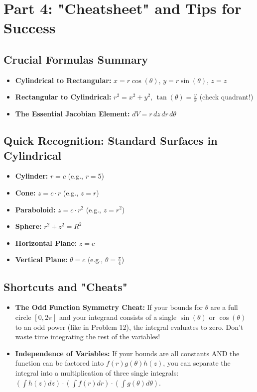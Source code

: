\documentclass[11pt]{article}
\begin{document}
\newpage
\section{Part 4: "Cheatsheet" and Tips for Success}

\subsection{Crucial Formulas Summary}
\begin{itemize}
    \item \textbf{Cylindrical to Rectangular:} $x = r \cos(\theta)$, $y = r \sin(\theta)$, $z = z$
    \item \textbf{Rectangular to Cylindrical:} $r^2 = x^2 + y^2$, $\tan(\theta) = \frac{y}{x}$ (check quadrant!)
    \item \textbf{The Essential Jacobian Element:} $dV = r \, dz \, dr \, d\theta$
\end{itemize}

\subsection{Quick Recognition: Standard Surfaces in Cylindrical}
\begin{itemize}
    \item \textbf{Cylinder:} $r = c$ (e.g., $r = 5$)
    \item \textbf{Cone:} $z = c \cdot r$ (e.g., $z = r$)
    \item \textbf{Paraboloid:} $z = c \cdot r^2$ (e.g., $z = r^2$)
    \item \textbf{Sphere:} $r^2 + z^2 = R^2$
    \item \textbf{Horizontal Plane:} $z = c$
    \item \textbf{Vertical Plane:} $\theta = c$ (e.g., $\theta = \frac{\pi}{4}$)
\end{itemize}

\subsection{Shortcuts and "Cheats"}
\begin{itemize}
    \item \textbf{The Odd Function Symmetry Cheat:} If your bounds for $\theta$ are a full circle $[0, 2\pi]$ and your integrand consists of a single $\sin(\theta)$ or $\cos(\theta)$ to an odd power (like in Problem 12), the integral evaluates to zero. Don't waste time integrating the rest of the variables!
    \item \textbf{Independence of Variables:} If your bounds are all constants AND the function can be factored into $f(r)g(\theta)h(z)$, you can separate the integral into a multiplication of three single integrals: $(\int h(z)dz) \cdot (\int f(r)dr) \cdot (\int g(\theta)d\theta)$.
\end{itemize}
\end{document}
